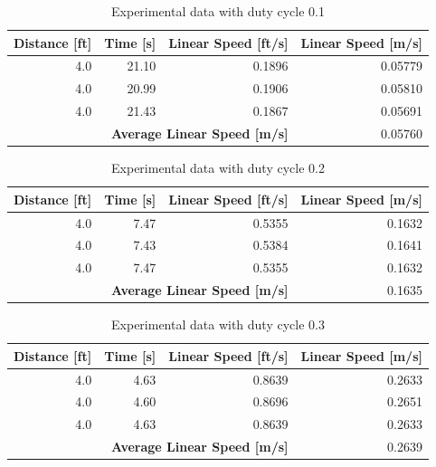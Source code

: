 \documentclass[fontsize=11pt, %
                             paper=letter, %
                             openany, %
                             captions=tableheading,
                             index=totoc,
                             hyperref]{labbook}
\begin{document}
\begin{addmargin}[0cm]{0cm}
\begin{table}[h!]
    \centering
    \begin{tabular}{r|r|r|r}
        \toprule
        \textbf{Distance [ft]} & \textbf{Time [s]} & \textbf{Linear Speed [ft/s]} & \textbf{Linear Speed [m/s]}\\
        \toprule
        4.0 & 21.10 & 0.1896 & 0.05779\\
        4.0 & 20.99 & 0.1906 & 0.05810\\
        4.0 & 21.43 & 0.1867 & 0.05691\\
        \bottomrule
        \multicolumn{3}{r|}{\textbf{Average Linear Speed [m/s]}} & 0.05760\\
        \bottomrule
    \end{tabular}
    \caption{Experimental data with duty cycle 0.1}
    \label{tab:duty0.1}
\end{table}

\begin{table}[h!]
    \centering
    \begin{tabular}{r|r|r|r}
        \toprule
        \textbf{Distance [ft]} & \textbf{Time [s]} & \textbf{Linear Speed [ft/s]} & \textbf{Linear Speed [m/s]}\\
        \toprule
        4.0 & 7.47 & 0.5355 & 0.1632\\
        4.0 & 7.43 & 0.5384 & 0.1641\\
        4.0 & 7.47 & 0.5355 & 0.1632\\
        \bottomrule
        \multicolumn{3}{r|}{\textbf{Average Linear Speed [m/s]}} & 0.1635\\
        \bottomrule
    \end{tabular}
    \caption{Experimental data with duty cycle 0.2}
    \label{tab:duty0.2}
\end{table}

\begin{table}[h!]
    \centering
    \begin{tabular}{r|r|r|r}
        \toprule
        \textbf{Distance [ft]} & \textbf{Time [s]} & \textbf{Linear Speed [ft/s]} & \textbf{Linear Speed [m/s]}\\
        \toprule
        4.0 & 4.63 & 0.8639 & 0.2633\\
        4.0 & 4.60 & 0.8696 & 0.2651\\
        4.0 & 4.63 & 0.8639 & 0.2633\\
        \bottomrule
        \multicolumn{3}{r|}{\textbf{Average Linear Speed [m/s]}} & 0.2639\\
        \bottomrule
    \end{tabular}
    \caption{Experimental data with duty cycle 0.3}
    \label{tab:duty0.3}
\end{table}


\end{addmargin}
\end{document}
